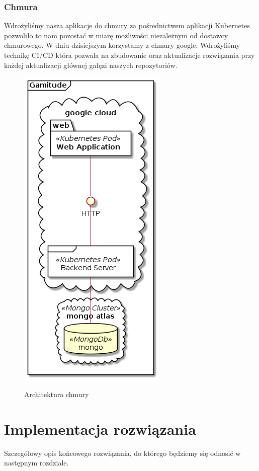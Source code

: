 \documentclass[a4paper,11pt]{report}
\begin{document}
\subsection{Chmura}
Wdrożyliśmy nasza aplikacje do chmury za pośrednictwem aplikacji Kubernetes pozwoliło to nam pozostać w miarę możliwości
niezależnym od dostawcy chmurowego. W dniu dzisiejszym korzystamy z chmury google.
Wdrożyliśmy technikę CI/CD która pozwala na zbudowanie oraz aktualizacje rozwiązania przy każdej aktualizacji głównej gałęzi naszych repozytoriów.
\begin{figure}[h]
	\centering
	\includegraphics[scale=0.5]{gamitude_cloud_overview}\\
	\caption{Architektura chmury}
	\label{fig:db}
\end{figure}
\chapter {Implementacja rozwiązania}
Szczegółowy opis końcowego rozwiązania, do którego będziemy się odnosić w następnym rozdziale.
\end{document}

